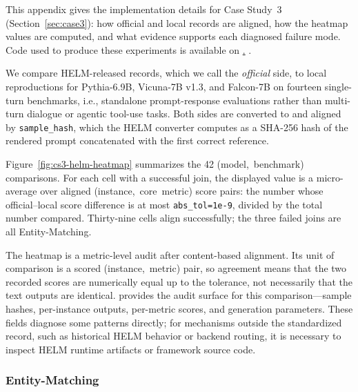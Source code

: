 
This appendix gives the implementation details for Case Study~3
(Section~\ref{sec:case3}): how official and local records are aligned, how the
  heatmap values are computed, and what evidence supports each diagnosed failure
  mode.
Code used to produce these experiments is available on 
\href{https://anonymous.4open.science/r/eval_audit-859B}.
.

We compare HELM-released records, which we call the \emph{official} side, to
  local reproductions for Pythia-6.9B, Vicuna-7B v1.3, and Falcon-7B on fourteen
  single-turn benchmarks, i.e., standalone prompt-response evaluations rather
  than multi-turn dialogue or agentic tool-use tasks.
Both sides are converted to \eee{} and aligned by \texttt{sample\_hash}, which
  the HELM converter computes as a SHA-256 hash of the rendered prompt
  concatenated with the first correct reference.

  
Figure~\ref{fig:cs3-helm-heatmap} summarizes the 42 \mbox{(model, benchmark)}
  comparisons.
For each cell with a successful join, the displayed value is a micro-average
  over aligned \mbox{(instance, core metric)} score pairs: the number whose
  official--local score difference is at most \texttt{abs\_tol=1e-9}, divided by
  the total number compared.
Thirty-nine cells align successfully; the three failed joins are all
  Entity-Matching.

The heatmap is a metric-level audit after content-based alignment.
Its unit of comparison is a scored \mbox{(instance, metric)} pair, so agreement
  means that the two recorded scores are numerically equal up to the tolerance,
  not necessarily that the text outputs are identical.
\eee{} provides the audit surface for this comparison---sample hashes,
  per-instance outputs, per-metric scores, and generation parameters.
These fields diagnose some patterns directly; for mechanisms outside the
  standardized record, such as historical HELM behavior or backend routing, it
  is necessary to inspect HELM runtime artifacts or framework source code.


\subsubsection{Entity-Matching}
\label{sec:app-helm-entity-matching}

